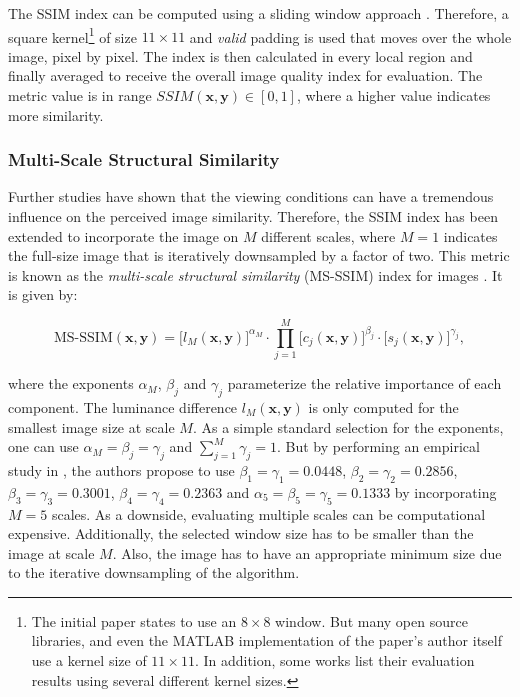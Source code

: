 The SSIM index can be computed using a sliding window approach \parencite{ssim-slide}. Therefore, a square kernel\footnote{The initial paper states to use an $ 8 \times 8 $ window. But many open source libraries, and even the MATLAB implementation of the paper's author itself use a kernel size of $ 11 \times 11 $. In addition, some works list their evaluation results using several different kernel sizes.} of size $ 11 \times 11 $ and \textit{valid} padding is used that moves over the whole image, pixel by pixel. The index is then calculated in every local region and finally averaged to receive the overall image quality index for evaluation. The metric value is in range $ SSIM(\textbf{x}, \textbf{y}) \in [0, 1] $, where a higher value indicates more similarity.

\subsubsection*{Multi-Scale Structural Similarity}

Further studies have shown that the viewing conditions can have a tremendous influence on the perceived image similarity. Therefore, the SSIM index has been extended to incorporate the image on $ M $ different scales, where $ M=1 $ indicates the full-size image that is iteratively downsampled by a factor of two. This metric is known as the \textit{multi-scale structural similarity} (MS-SSIM) index for images \parencite{ms-ssim}. It is given by:

\begin{equation} \label{eq:ms-ssim}
\textrm{MS-SSIM}(\textbf{x}, \textbf{y}) = \big[ l_M(\textbf{x}, \textbf{y})\big]^{\alpha_M} \cdot \prod\limits_{j=1}^{M} \big[c_j(\textbf{x}, \textbf{y}) \big]^{\beta_j} \cdot \big[ s_j(\textbf{x}, \textbf{y}) \big]^{\gamma_j} ,
\end{equation}

where the exponents $ \alpha_M $, $ \beta_j $ and $ \gamma_j $ parameterize the relative importance of each component. The luminance difference $ l_M(\textbf{x}, \textbf{y}) $ is only computed for the smallest image size at scale $ M $. As a simple standard selection for the exponents, one can use $ \alpha_M = \beta_j = \gamma_j $ and $ \sum_{j=1}^{M} \gamma_j = 1 $. But by performing an empirical study in \parencite{ms-ssim}, the authors propose to use $ \beta_1 = \gamma_1 = 0.0448 $, $ \beta_2 = \gamma_2 = 0.2856 $, $ \beta_3 = \gamma_3 = 0.3001 $, $ \beta_4 = \gamma_4 = 0.2363 $ and $ \alpha_5 = \beta_5 = \gamma_5 = 0.1333 $ by incorporating $ M=5 $ scales. As a downside, evaluating multiple scales can be computational expensive. Additionally, the selected window size has to be smaller than the image at scale $ M $. Also, the image has to have an appropriate minimum size due to the iterative downsampling of the algorithm.


